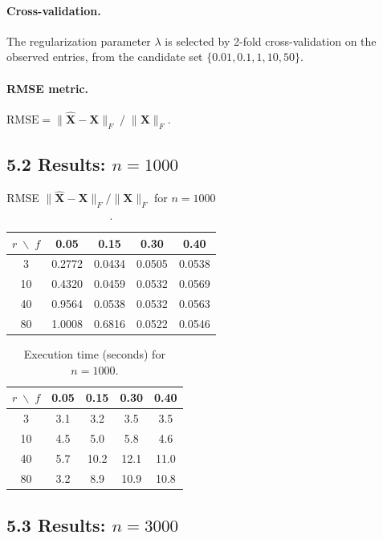 \documentclass[11pt]{article}
\begin{document}
\paragraph{Cross-validation.}
The regularization parameter $\lambda$ is selected by 2-fold cross-validation on the
observed entries, from the candidate set $\{0.01, 0.1, 1, 10, 50\}$.

\paragraph{RMSE metric.}
$\text{RMSE} = \|\hat{\boldsymbol{X}} - \boldsymbol{X}\|_F \;/\; \|\boldsymbol{X}\|_F$.

\subsection*{5.2 Results: $n = 1000$}

\begin{table}[h!]
\centering
\caption{RMSE $\|\hat{\boldsymbol{X}}-\boldsymbol{X}\|_F/\|\boldsymbol{X}\|_F$ for $n=1000$.}
\begin{tabular}{c|cccc}
\toprule
$r \;\backslash\; f$ & 0.05 & 0.15 & 0.30 & 0.40 \\
\midrule
3  & 0.2772 & 0.0434 & 0.0505 & 0.0538 \\
10 & 0.4320 & 0.0459 & 0.0532 & 0.0569 \\
40 & 0.9564 & 0.0538 & 0.0532 & 0.0563 \\
80 & 1.0008 & 0.6816 & 0.0522 & 0.0546 \\
\bottomrule
\end{tabular}
\end{table}

\begin{table}[h!]
\centering
\caption{Execution time (seconds) for $n=1000$.}
\begin{tabular}{c|cccc}
\toprule
$r \;\backslash\; f$ & 0.05 & 0.15 & 0.30 & 0.40 \\
\midrule
3  & 3.1 & 3.2 & 3.5 & 3.5 \\
10 & 4.5 & 5.0 & 5.8 & 4.6 \\
40 & 5.7 & 10.2 & 12.1 & 11.0 \\
80 & 3.2 & 8.9 & 10.9 & 10.8 \\
\bottomrule
\end{tabular}
\end{table}

\subsection*{5.3 Results: $n = 3000$}
\end{document}
